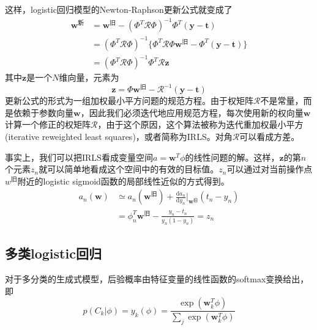 这样，logistic回归模型的Newton-Raphson更新公式就变成了
\begin{equation}
	\begin{aligned}
	\boldsymbol{w}^{\text{新}}&=\boldsymbol{w}^{\text{旧}}-(\Phi^T\mathcal{R}\Phi)^{-1}\Phi^T(\boldsymbol{y}-\boldsymbol{t})\\
	&=(\Phi^T\mathcal{R}\Phi)^{-1}\{\Phi^T\mathcal{R}\Phi\boldsymbol{w}^{\text{旧}}- \Phi^T(\boldsymbol{y}-\boldsymbol{t})\}\\
	&=(\Phi^T\mathcal{R}\Phi)^{-1}\Phi^T\mathcal{R}\boldsymbol{z}
	\end{aligned}
\end{equation}
其中$\boldsymbol{z}$是一个$N$维向量，元素为
\begin{equation}
	\boldsymbol{z}=\Phi\boldsymbol{w}^{\text{旧}}-\mathcal{R}^{-1}(\boldsymbol{y}-\boldsymbol{t})
\end{equation}
更新公式的形式为一组加权最小平方问题的规范方程。由于权矩阵$\mathcal{R}$不是常量，而是依赖于参数向量$\boldsymbol{w}$，因此我们必须迭代地应用规范方程，每次使用新的权向量$\boldsymbol{w}$计算一个修正的权矩阵$\mathcal{R}$，由于这个原因，这个算法被称为迭代重加权最小平方(iterative reweighted least squares)，或者简称为IRLS。对角$\mathcal{R}$可以看成方差。

事实上，我们可以把IRLS看成变量空间$a=\boldsymbol{w}^T\phi$的线性问题的解。这样，$\boldsymbol{z}$的第$n$个元素$z_n$就可以简单地看成这个空间中的有效的目标值。$z_n$可以通过对当前操作点$w^{\text{旧}}$附近的logistic sigmoid函数的局部线性近似的方式得到。
\begin{equation}
\begin{aligned}
	a_n(\boldsymbol{w})&\simeq a_n(\boldsymbol{w}^{\text{旧}})+\frac{\mathrm{d}a_n}{\mathrm{d}y_n}\Bigg|_{\boldsymbol{w}^{\text{旧}}}(t_n-y_n)\\
		&=\phi_n^T\boldsymbol{w}^{\text{旧}}-\frac{y_n-t_n}{y_n(1-y_n)}=z_n
\end{aligned}
\end{equation}
\subsection*{多类logistic回归}
对于多分类的生成式模型，后验概率由特征变量的线性函数的softmax变换给出，即
\begin{equation}
	p(C_k|\phi)=y_k(\phi)=\frac{\exp(\boldsymbol{w}_k^T\phi)}{\sum_j\exp(\boldsymbol{w}_k^T\phi)}
\end{equation}

